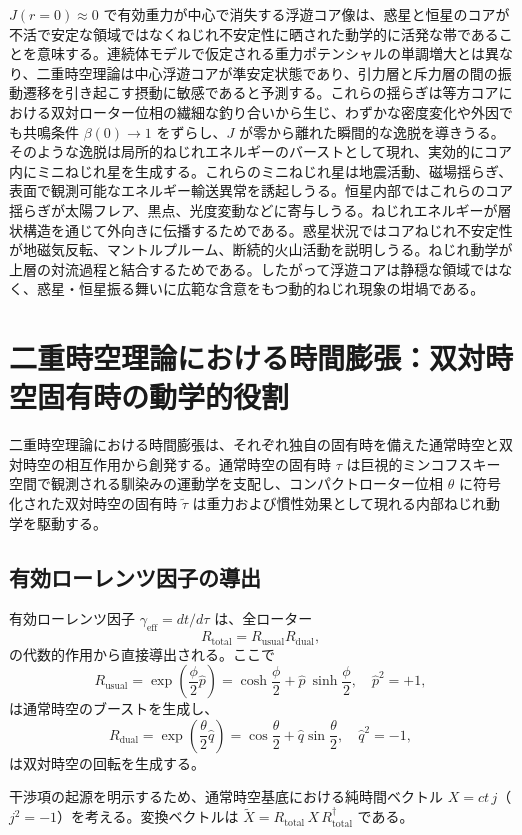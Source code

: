 \documentclass[a4paper]{article}
\begin{document}
$J(r=0) \approx 0$ で有効重力が中心で消失する浮遊コア像は、惑星と恒星のコアが不活で安定な領域ではなくねじれ不安定性に晒された動学的に活発な帯であることを意味する。連続体モデルで仮定される重力ポテンシャルの単調増大とは異なり、二重時空理論は中心浮遊コアが準安定状態であり、引力層と斥力層の間の振動遷移を引き起こす摂動に敏感であると予測する。これらの揺らぎは等方コアにおける双対ローター位相の繊細な釣り合いから生じ、わずかな密度変化や外因でも共鳴条件 $\beta(0) \to 1$ をずらし、$J$ が零から離れた瞬間的な逸脱を導きうる。そのような逸脱は局所的ねじれエネルギーのバーストとして現れ、実効的にコア内にミニねじれ星を生成する。これらのミニねじれ星は地震活動、磁場揺らぎ、表面で観測可能なエネルギー輸送異常を誘起しうる。恒星内部ではこれらのコア揺らぎが太陽フレア、黒点、光度変動などに寄与しうる。ねじれエネルギーが層状構造を通じて外向きに伝播するためである。惑星状況ではコアねじれ不安定性が地磁気反転、マントルプルーム、断続的火山活動を説明しうる。ねじれ動学が上層の対流過程と結合するためである。したがって浮遊コアは静穏な領域ではなく、惑星・恒星振る舞いに広範な含意をもつ動的ねじれ現象の坩堝である。

\section{二重時空理論における時間膨張：双対時空固有時の動学的役割}
\label{sec:timedilation}

二重時空理論における時間膨張は、それぞれ独自の固有時を備えた通常時空と双対時空の相互作用から創発する。通常時空の固有時 $\tau$ は巨視的ミンコフスキー空間で観測される馴染みの運動学を支配し、コンパクトローター位相 $\theta$ に符号化された双対時空の固有時 $\tilde{\tau}$ は重力および慣性効果として現れる内部ねじれ動学を駆動する。

\subsection{有効ローレンツ因子の導出}

有効ローレンツ因子 $\gamma_\text{eff} = dt/d\tau$ は、全ローター
\[
R_\text{total} = R_\text{usual} R_\text{dual},
\]
の代数的作用から直接導出される。ここで
\[
R_\text{usual} = \exp\!\left(\frac{\phi}{2} \hat{p}\right) = \cosh\frac{\phi}{2} + \hat{p}\: \sinh\frac{\phi}{2}, \quad \hat{p}^2 = +1,
\]
は通常時空のブーストを生成し、
\[
R_\text{dual} = \exp\!\left(\frac{\theta}{2} \hat{q}\right) = \cos\frac{\theta}{2} + \hat{q} \sin\frac{\theta}{2}, \quad \hat{q}^2 = -1,
\]
は双対時空の回転を生成する。

干渉項の起源を明示するため、通常時空基底における純時間ベクトル $X = ct \, j$（$j^2 = -1$）を考える。変換ベクトルは $\tilde{X} = R_\text{total} \, X \, R_\text{total}^\dagger$ である。
\end{document}
